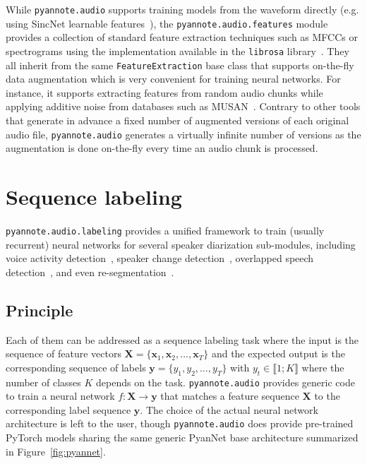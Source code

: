 \documentclass{article}
\begin{document}
While {\small\texttt{pyannote.audio}} supports training models from the waveform directly (e.g. using SincNet learnable features~\cite{Ravanelli2018}), the {\small\texttt{pyannote.audio.features}} module provides a collection of standard feature extraction techniques such as MFCCs or spectrograms using the implementation available in  the {\small\texttt{librosa}} library~\cite{librosa}. They all inherit from the same {\small\texttt{FeatureExtraction}} base class that supports on-the-fly data augmentation which is very convenient for training neural networks. For instance, it supports extracting features from random audio chunks while applying  additive noise from databases such as MUSAN~\cite{musan}. Contrary to other tools that generate in advance a fixed number of augmented versions of each original audio file, {\small\texttt{pyannote.audio}} generates a virtually infinite number of versions as the augmentation is done on-the-fly every time an audio chunk is processed.

\vspace{-0.17cm}
\section{Sequence labeling}
\label{sec:labeling}

{\small\texttt{pyannote.audio.labeling}} provides a unified framework to train (usually recurrent) neural networks for several speaker diarization sub-modules, including voice activity detection~\cite{Gelly2018}, speaker change detection~\cite{Yin2017}, overlapped speech detection~\cite{Bullock2020}, and even re-segmentation~\cite{Yin2018}.

\vspace{-0.17cm}
\subsection{Principle}
\label{ssec:principle}

Each of them can be addressed as a sequence labeling task where the input is the sequence of feature vectors $\mathbf{X} = \{\mathbf{x}_1, \mathbf{x}_2, \ldots, \mathbf{x}_T\}$ and the expected output is the corresponding sequence of labels $\mathbf{y} = \{y_1, y_2,\ldots, y_T\}$ with $y_t \in \llbracket 1; K \rrbracket$ where the number of classes $K$ depends on the task. {\small\texttt{pyannote.audio}} provides generic code to train a neural network $f: \mathbf{X}\rightarrow\mathbf{y}$ that matches a feature sequence $\mathbf{X}$ to the corresponding label sequence $\mathbf{y}$. The choice of the actual neural network architecture is left to the user, though {\small\texttt{pyannote.audio}} does provide pre-trained PyTorch models sharing the same generic PyanNet base architecture summarized in Figure~\ref{fig:pyannet}.
\end{document}
